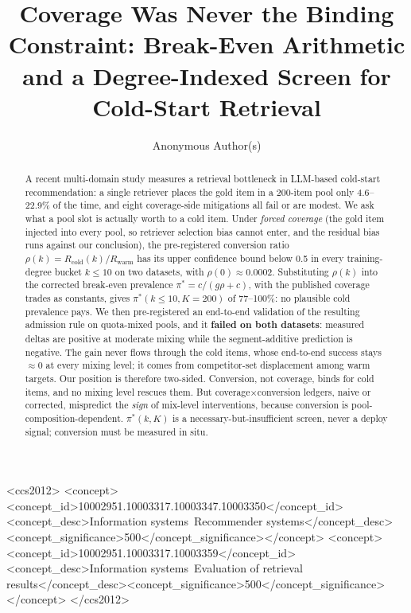 \documentclass[sigconf,anonymous,review]{acmart}
\begin{document}
\title[Coverage Was Never the Binding Constraint]{Coverage Was Never the Binding Constraint: Break-Even Arithmetic and a Degree-Indexed Screen for Cold-Start Retrieval}

\author{Anonymous Author(s)}

\begin{abstract}
A recent multi-domain study measures a retrieval bottleneck in LLM-based cold-start recommendation: a single retriever places the gold item in a 200-item pool only 4.6--22.9\% of the time, and eight coverage-side mitigations all fail or are modest. We ask what a pool slot is actually worth to a cold item. Under \emph{forced coverage} (the gold item injected into every pool, so retriever selection bias cannot enter, and the residual bias runs against our conclusion), the pre-registered conversion ratio $\rho(k)=R_{\mathrm{cold}}(k)/R_{\mathrm{warm}}$ has its upper confidence bound below 0.5 in every training-degree bucket $k\le 10$ on two datasets, with $\rho(0)\approx 0.0002$. Substituting $\rho(k)$ into the corrected break-even prevalence $\pi^*=c/(g\rho+c)$, with the published coverage trades as constants, gives $\pi^*(k\le 10,K{=}200)$ of 77--100\%: no plausible cold prevalence pays. We then pre-registered an end-to-end validation of the resulting admission rule on quota-mixed pools, and it \textbf{failed on both datasets}: measured deltas are positive at moderate mixing while the segment-additive prediction is negative. The gain never flows through the cold items, whose end-to-end success stays $\approx 0$ at every mixing level; it comes from competitor-set displacement among warm targets. Our position is therefore two-sided. Conversion, not coverage, binds for cold items, and no mixing level rescues them. But coverage$\times$conversion ledgers, naive or corrected, mispredict the \emph{sign} of mix-level interventions, because conversion is pool-composition-dependent. $\pi^*(k,K)$ is a necessary-but-insufficient screen, never a deploy signal; conversion must be measured in situ.
\end{abstract}

\begin{CCSXML}
<ccs2012>
<concept><concept_id>10002951.10003317.10003347.10003350</concept_id><concept_desc>Information systems~Recommender systems</concept_desc><concept_significance>500</concept_significance></concept>
<concept><concept_id>10002951.10003317.10003359</concept_id><concept_desc>Information systems~Evaluation of retrieval results</concept_desc><concept_significance>500</concept_significance></concept>
</ccs2012>
\end{CCSXML}
\end{document}

